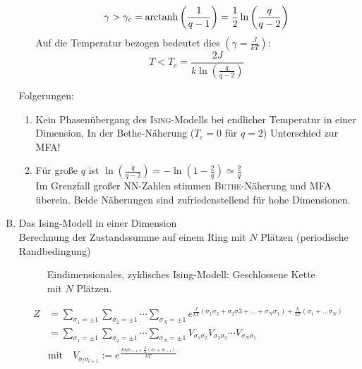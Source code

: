 \begin{enumerate}[A)]
\begin{enumerate}
        \begin{equation}
            \gamma > \gamma_c = \operatorname{arctanh} \left( \frac{1}{q - 1} \right) = \frac{1}{2} \ln \left( \frac{q}{q - 2} \right)
        \end{equation}
        Auf die Temperatur bezogen bedeutet dies $ \left( \gamma = \frac{J}{k T} \right)$:
        \begin{equation}
            T < T_c = \frac{2 J}{k \ln \left( \frac{q}{q-2} \right) }
        \end{equation}
    \end{enumerate}
    Folgerungen:
    \begin{enumerate}
        \item Kein Phasenübergang des \textsc{Ising}-Modells bei endlicher Temperatur in einer Dimension, In der Bethe-Näherung ($T_c = 0$ für $q = 2$)
        Unterschied zur MFA!
        \item Für große $q$ ist $\ln \left( \frac{q}{q-2} \right) = - \ln \left( 1 - \frac{2}{q} \right) \simeq \frac{2}{q}$ \\
        Im Grenzfall großer NN-Zahlen stimmen \textsc{Bethe}-Näherung und MFA überein. Beide Näherungen sind zufriedenstellend für hohe Dimensionen.
    \end{enumerate}
    \item Das Ising-Modell in einer Dimension \\
    Berechnung der Zustandssumme auf einem Ring mit $N$ Plätzen (periodische Randbedingung)
    \begin{figure}[H]
        \centering
        \def\svgwidth{0.35\textwidth}
        
        \caption{Eindimensionales, zyklisches Ising-Modell: Geschlossene Kette mit $N$ Plätzen.}
        \label{img:IsingRing}
    \end{figure}
    \begin{equation}
        \begin{split}
            Z &= \sum_{\sigma_1 = \pm 1} \sum_{\sigma_2 = \pm 1} \cdots \sum_{\sigma_N = \pm 1} e^{\frac{J}{k T} \left( \sigma_1 \sigma_2 + \sigma_2 \sigma3 + \ldots + \sigma_N \sigma_1 \right) + \frac{h}{k T} \left( \sigma_1 + \ldots \sigma_N \right)} \\
            &=\sum_{\sigma_1 = \pm 1} \sum_{\sigma_2 = \pm 1} \cdots \sum_{\sigma_N = \pm 1} V_{\sigma_1 \sigma_2} V_{\sigma_2 \sigma_3} \cdots V_{\sigma_N \sigma_1}  \\
            & \text{mit} \quad V_{\sigma_l \sigma_{l+1}} := e^{\frac{J \sigma_l \sigma_{l+1} + \frac{h}{2} \left( \sigma_l + \sigma_{l+1} \right) }{k T}}

\end{split}
\end{equation}
\end{enumerate}
